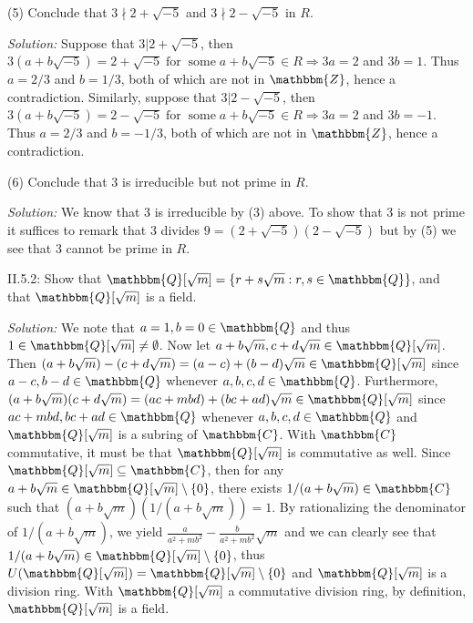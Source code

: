 \documentclass{letter}
\newcommand{\tmem}[1]{{\em #1\/}}
\newcommand{\tmop}[1]{\ensuremath{\operatorname{#1}}}
\begin{document}
(5) Conclude that $3 \nmid 2 + \sqrt{- 5}$ and $3 \nmid 2 - \sqrt{- 5}$ in
$R$.

{\tmem{Solution:}} Suppose that $3 | 2 + \sqrt{- 5}$, then $3 (a + b \sqrt{-
5}) = 2 + \sqrt{- 5} \tmop{for} \tmop{some} a + b \sqrt{- 5} \in R \Rightarrow
3 a = 2$ and $3 b = 1$. Thus $a = 2 / 3$ and $b = 1 / 3$, both of which are
not in $\mathbbm{Z}$, hence a contradiction. Similarly, suppose that $3 | 2 -
\sqrt{- 5}$, then $3 (a + b \sqrt{- 5}) = 2 - \sqrt{- 5} \tmop{for}
\tmop{some} a + b \sqrt{- 5} \in R \Rightarrow 3 a = 2$ and $3 b = - 1$. Thus
$a = 2 / 3$ and $b = - 1 / 3$, both of which are not in $\mathbbm{Z}$, hence a
contradiction.

(6) Conclude that $3$ is irreducible but not prime in $R$.

{\tmem{Solution:}} We know that 3 is irreducible by (3) above. To show that 3
is not prime it suffices to remark that $3$ divides $9 = (2 + \sqrt{- 5}) (2 -
\sqrt{- 5})$ but by (5) we see that 3 cannot be prime in $R$.

II.5.2: Show that $\mathbbm{Q}[ \sqrt{m}] =\{r + s \sqrt{m} : r, s \in
\mathbbm{Q}\}$, and that $\mathbbm{Q}[ \sqrt{m}]$ is a field.

{\tmem{Solution:}} We note that $a = 1, b = 0 \in \mathbbm{Q}$ and thus $1
\in \mathbbm{Q}[ \sqrt{m}] \neq \emptyset$. Now let $a + b \sqrt{m}, c + d
\sqrt{m} \in \mathbbm{Q}[ \sqrt{m}]$. Then $\text{($a + b \sqrt{m}) - (c + d
\sqrt{m})$} = (a - c) + (b - d) \sqrt{m} \in \mathbbm{Q}[ \sqrt{m}]$ since $a
- c, b - d \in \mathbbm{Q}$ whenever $a, b, c, d \in \mathbbm{Q}$.
Furthermore, $(a + b \sqrt{m}) (c + d \sqrt{m}) = (a c + m b d) + (b c + a d)
\sqrt{m} \in \mathbbm{Q}[ \sqrt{m}]$ since $a c + m b d, b c + a d \in
\mathbbm{Q}$ whenever $a, b, c, d \in \mathbbm{Q}$ and $\mathbbm{Q}[
\sqrt{m}]$ is a subring of $\mathbbm{C}$. With $\mathbbm{C}$ commutative, it
must be that $\mathbbm{Q}[ \sqrt{m}]$ is commutative as well. Since
$\mathbbm{Q}[ \sqrt{m}] \subseteq \mathbbm{C}$, then for any $a + b \sqrt{m}
\in \mathbbm{Q}[ \sqrt{m}] \setminus \{0\}$, there exists $1 / (a + b
\sqrt{m}) \in \mathbbm{C}$ such that $(a + b \sqrt{m}) (1 / (a + b \sqrt{m}))
= 1$. By rationalizing the denominator of $1 / (a + b \sqrt{m})$, we yield
$\frac{a}{a^2 + m b^2} - \frac{b}{a^2 + m b^2} \sqrt{m}$ and we can clearly
see that $1 / (a + b \sqrt{m}) \in \mathbbm{Q}[ \sqrt{m}] \setminus \{0\}$,
thus $U (\mathbbm{Q}[ \sqrt{m}]) =\mathbbm{Q}[ \sqrt{m}] \setminus \{0\}$ and
$\mathbbm{Q}[ \sqrt{m}]$ is a division ring. With $\mathbbm{Q}[ \sqrt{m}]$ a
commutative division ring, by definition, $\mathbbm{Q}[ \sqrt{m}]$ is a field.
\end{document}
